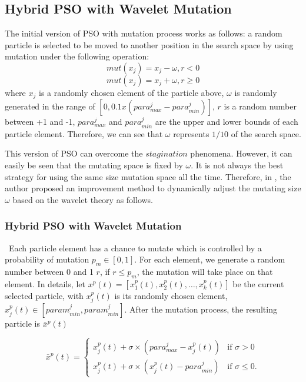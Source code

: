 \subsection{Hybrid PSO with Wavelet Mutation}
The initial version of PSO with mutation process works as follows: a random particle is selected to be moved to another position in the search space by using mutation under the following operation:
\begin{equation}
mut(x_j) = x_j - \omega, r < 0
\end{equation}
\begin{equation}
mut(x_j) = x_j + \omega, r \geq 0
\end{equation}
where $x_j$ is a randomly chosen element of the particle above, $\omega$ is randomly generated in the range of $[0, 0.1 x (para^j_{max} - para^j_{min})]$, $r$ is a random number between +1 and -1, $para^j_{max}$ and $para^j_{min}$ are the upper and lower bounds of each particle element. Therefore, we can see that $\omega$ represents $1/10$ of the search space.

This version of PSO can overcome the $stagination$ phenomena. However, it can easily be seen that the mutating space is fixed by $\omega$. It is not always the best strategy for using the same size mutation space all the time. Therefore, in \cite{ling2008hybrid}, the author proposed an improvement method to dynamically adjust the mutating size $\omega$ based on the wavelet theory as follows.

\subsubsection{Hybrid PSO with Wavelet Mutation}
\
Each particle element has a chance to mutate which is controlled by a probability of mutation $p_m \in [0, 1]$. For each element, we generate a random number between 0 and 1 $r$, if $r \leq p_m$, the mutation will take place on that element. In details, let $x^p(t) = [x^p_1(t), x^p_2(t), \ldots, x^p_k(t)]$ be the current selected particle, with $x^p_j(t)$ is its randomly chosen element, $x^p_j(t) \in [param^j_{min}, param^j_{min}]$. After the mutation process, the resulting particle is $\bar{x}^p(t)$

\[ \bar{x}^p(t) = \left\{ \begin{array}{ll}
         x^p_j(t) + \sigma \times (para^j_{max} - x^p_j(t)) & \mbox{if $\sigma > 0$} \\
        x^p_j(t) + \sigma \times (x^p_j(t) - para^j_{min}) & \mbox{if $\sigma \leq 0$}.\end{array} \right. \] 

